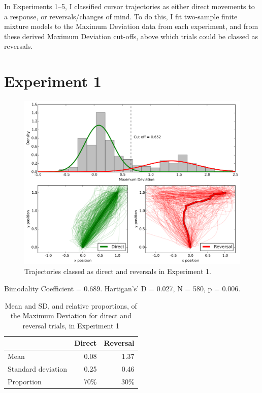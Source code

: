 
In Experiments 1--5,
I classified cursor trajectories as either
direct movements to a response,
or reversals/changes of mind.
To do this, I fit two-sample finite mixture models
to the Maximum Deviation data from each experiment,
and from these derived Maximum Deviation cut-offs,
above which trials could be classed as reversals.

\newpage

\FloatBarrier
\section*{Experiment 1}\label{experiment-1}

\begin{figure}[ht]
  \centering
  \includegraphics[width=\textwidth]{imgs/reversals/exp1-reversals}
  \caption[]{
    \label{fig:exp1-reversals}
    Trajectories classed as direct and reversals in Experiment 1.
  }
\end{figure}

Bimodality Coefficient = 0.689.
Hartigan's' D = 0.027, N = 580, p = 0.006.

\begin{table}[hp]
  \centering
  \caption[]{
    Mean and SD, and relative proportions, of the Maximum Deviation for direct and reversal trials, in Experiment 1
    \label{tab:appendix-reversals-1}
  }
  \begin{tabular}{lrr}
    \toprule
                       &   Direct &   Reversal \\
    \midrule
    Mean               &     0.08 &             1.37 \\
    Standard deviation &     0.25 &             0.46 \\
    Proportion         &    70\%    &            30\%    \\
    \bottomrule
  \end{tabular}
  
\end{table}


